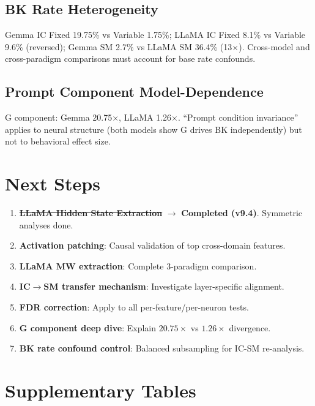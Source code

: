 \documentclass[11pt,a4paper]{article}
\begin{document}
\subsection{BK Rate Heterogeneity}

Gemma IC Fixed 19.75\% vs Variable 1.75\%; LLaMA IC Fixed 8.1\% vs Variable 9.6\% (reversed); Gemma SM 2.7\% vs LLaMA SM 36.4\% (13$\times$). Cross-model and cross-paradigm comparisons must account for base rate confounds.

\subsection{Prompt Component Model-Dependence}

G component: Gemma 20.75$\times$, LLaMA 1.26$\times$. ``Prompt condition invariance'' applies to neural structure (both models show G drives BK independently) but not to behavioral effect size.

\section{Next Steps}

\begin{enumerate}[nosep]
    \item \sout{\textbf{LLaMA Hidden State Extraction}} $\rightarrow$ \textbf{Completed (v9.4)}. Symmetric analyses done.
    \item \textbf{Activation patching}: Causal validation of top cross-domain features.
    \item \textbf{LLaMA MW extraction}: Complete 3-paradigm comparison.
    \item \textbf{IC$\rightarrow$SM transfer mechanism}: Investigate layer-specific alignment.
    \item \textbf{FDR correction}: Apply to all per-feature/per-neuron tests.
    \item \textbf{G component deep dive}: Explain $20.75\times$ vs $1.26\times$ divergence.
    \item \textbf{BK rate confound control}: Balanced subsampling for IC-SM re-analysis.
\end{enumerate}

\appendix
\section{Supplementary Tables}
\end{document}
